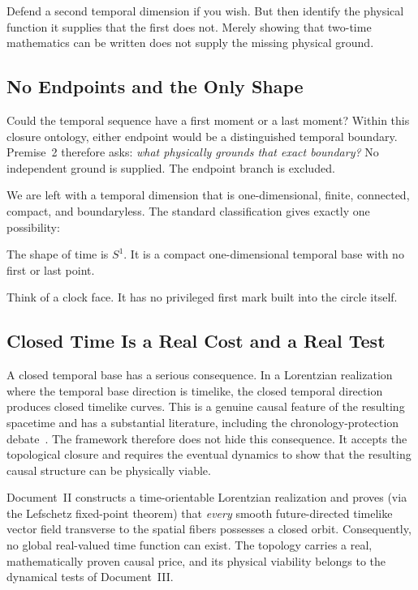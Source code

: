 \documentclass[11pt]{article}
\theoremstyle{canonstyle}
\providecommand{\Sone}{S^1}
\begin{document}
\begin{ifyoudisagree}
Defend a second temporal dimension if you wish. But then identify the physical function it supplies that the first does not. Merely showing that two-time mathematics can be written does not supply the missing physical ground.
\end{ifyoudisagree}

\subsection{No Endpoints and the Only Shape}

Could the temporal sequence have a first moment or a last moment? Within this closure ontology, either endpoint would be a distinguished temporal boundary. Premise~2 therefore asks: \emph{what physically grounds that exact boundary?} No independent ground is supplied. The endpoint branch is excluded.

We are left with a temporal dimension that is one-dimensional, finite, connected, compact, and boundaryless. The standard classification gives exactly one possibility:

\begin{keyresult}
The shape of time is $\Sone$. It is a compact one-dimensional temporal base with no first or last point.
\end{keyresult}

Think of a clock face. It has no privileged first mark built into the circle itself. 

\subsection{Closed Time Is a Real Cost and a Real Test}

A closed temporal base has a serious consequence. In a Lorentzian realization where the temporal base direction is timelike, the closed temporal direction produces closed timelike curves. This is a genuine causal feature of the resulting spacetime and has a substantial literature, including the chronology-protection debate~\cite{HawkingChronology}. The framework therefore does not hide this consequence. It accepts the topological closure and requires the eventual dynamics to show that the resulting causal structure can be physically viable.

\newpage
\begin{forthecurious}
Document~II constructs a time-orientable Lorentzian realization and proves (via the Lefschetz fixed-point theorem) that \emph{every} smooth future-directed timelike vector field transverse to the spatial fibers possesses a closed orbit. Consequently, no global real-valued time function can exist. The topology carries a real, mathematically proven causal price, and its physical viability belongs to the dynamical tests of Document~III.
\end{forthecurious}
\end{document}
